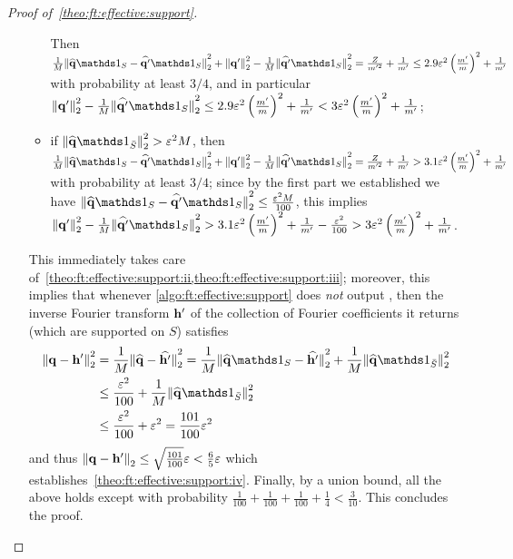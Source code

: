 \begin{proof}[Proof of~\cref{theo:ft:effective:support}]
\begin{itemize}
\begin{itemize}
      Then $\frac{1}{M}\normtwo{\fourier{\q}\indicSet{S}-\fourier{\q'}\indicSet{S}}^2 + \normtwo{\q'}^2 - \frac{1}{M}\normtwo{\fourier{\q'}\indicSet{S}}^2 = \frac{Z}{m'^2}+\frac{1}{m'} \leq 2.9\eps^2\left(\frac{m'}{m}\right)^2+\frac{1}{m'}$ with probability at least $3/4$, and in particular 
      $\normtwo{\q'}^2 - \frac{1}{M}\normtwo{\fourier{\q'}\indicSet{S}}^2 \leq 2.9\eps^2\left(\frac{m'}{m}\right)^2+\frac{1}{m'} < 3\eps^2\left(\frac{m'}{m}\right)^2+\frac{1}{m'}$;
      \item if $\normtwo{\fourier{\q}\indicSet{\bar{S}}}^2 > \eps^2M$,
           then $\frac{1}{M}\normtwo{\fourier{\q}\indicSet{S}-\fourier{\q'}\indicSet{S}}^2 + \normtwo{\q'}^2 - \frac{1}{M}\normtwo{\fourier{\q'}\indicSet{S}}^2 =\frac{Z}{m'^2}+\frac{1}{m'} > 3.1\eps^2\left(\frac{m'}{m}\right)^2+\frac{1}{m'}$ with probability at least $3/4$; since by the first part we established we have $\normtwo{\fourier{\q}\indicSet{S}-\fourier{\q'}\indicSet{S}}^2\leq \frac{\eps^2M}{100}$, this implies $\normtwo{\q'}^2 - \frac{1}{M}\normtwo{\fourier{\q'}\indicSet{S}}^2 > 3.1\eps^2\left(\frac{m'}{m}\right)^2+\frac{1}{m'} - \frac{\eps^2}{100}>  3\eps^2\left(\frac{m'}{m}\right)^2+\frac{1}{m'}$.
    \end{itemize}
    
    This immediately takes care of~\cref{theo:ft:effective:support:ii,theo:ft:effective:support:iii}; moreover, this implies that whenever \cref{algo:ft:effective:support} does \emph{not} output \reject, then the inverse Fourier transform $\mathbf{h}'$ of the collection of Fourier coefficients it returns (which are supported on $S$) satisfies
    \begin{align*}
       \normtwo{\q-\h'}^2 &= \frac{1}{M}\normtwo{\fourier{\q}-\fourier{\h'}}^2 = \frac{1}{M}\normtwo{\fourier{\q}\indicSet{S}-\fourier{\h'}}^2 + \frac{1}{M}\normtwo{\fourier{\q}\indicSet{\bar{S}}}^2 \\
        &\leq \frac{\eps^2}{100} + \frac{1}{M}\normtwo{\fourier{\q}\indicSet{\bar{S}}}^2 \\
        &\leq \frac{\eps^2}{100} + \eps^2 = \frac{101}{100}\eps^2
    \end{align*}
    and thus
    $
        {\lVert\mathbf{q}-\mathbf{h}'{\rVert}}_2 \leq  \sqrt{\frac{101}{100}}\varepsilon < \frac{6}{5}\varepsilon
    $
    which establishes~\cref{theo:ft:effective:support:iv}. Finally, by a union bound, all the above holds except with probability $\frac{1}{100}+\frac{1}{100}+\frac{1}{100}+\frac{1}{4}<\frac{3}{10}$. This concludes the proof.

\end{itemize}

\end{proof}




